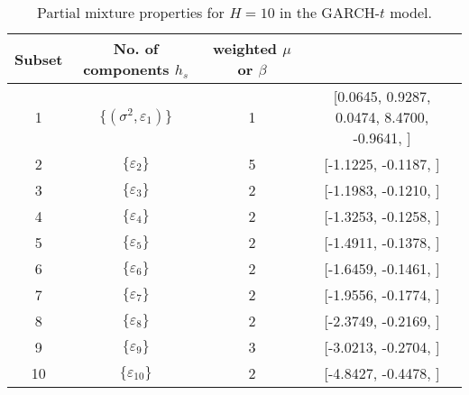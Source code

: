 \begin{table}[h] 
\centering 
\caption{Partial mixture properties for $H=10$ in the GARCH-$t$ model.} 
\label{tab:pmits_t_garch} 
\begin{tabular}{cccc}  
 Subset & No. of components $h_{s}$ & weighted $\mu$ or $\beta$  \\ \hline 
1 & $\{(\sigma^{2},\varepsilon_{1})\}$ & 1 & [0.0645, 0.9287, 0.0474, 8.4700, -0.9641, ]   \\ [1ex] 
2 & $\{\varepsilon_{2}\}$ & 5 & [-1.1225, -0.1187, ]   \\ [1ex] 
3 & $\{\varepsilon_{3}\}$ & 2 & [-1.1983, -0.1210, ]   \\ [1ex] 
4 & $\{\varepsilon_{4}\}$ & 2 & [-1.3253, -0.1258, ]   \\ [1ex] 
5 & $\{\varepsilon_{5}\}$ & 2 & [-1.4911, -0.1378, ]   \\ [1ex] 
6 & $\{\varepsilon_{6}\}$ & 2 & [-1.6459, -0.1461, ]   \\ [1ex] 
7 & $\{\varepsilon_{7}\}$ & 2 & [-1.9556, -0.1774, ]   \\ [1ex] 
8 & $\{\varepsilon_{8}\}$ & 2 & [-2.3749, -0.2169, ]   \\ [1ex] 
9 & $\{\varepsilon_{9}\}$ & 3 & [-3.0213, -0.2704, ]   \\ [1ex] 
10 & $\{\varepsilon_{10}\}$ & 2 & [-4.8427, -0.4478, ]   \\ [1ex] 
\hline 
\end{tabular} 
\end{table} 
